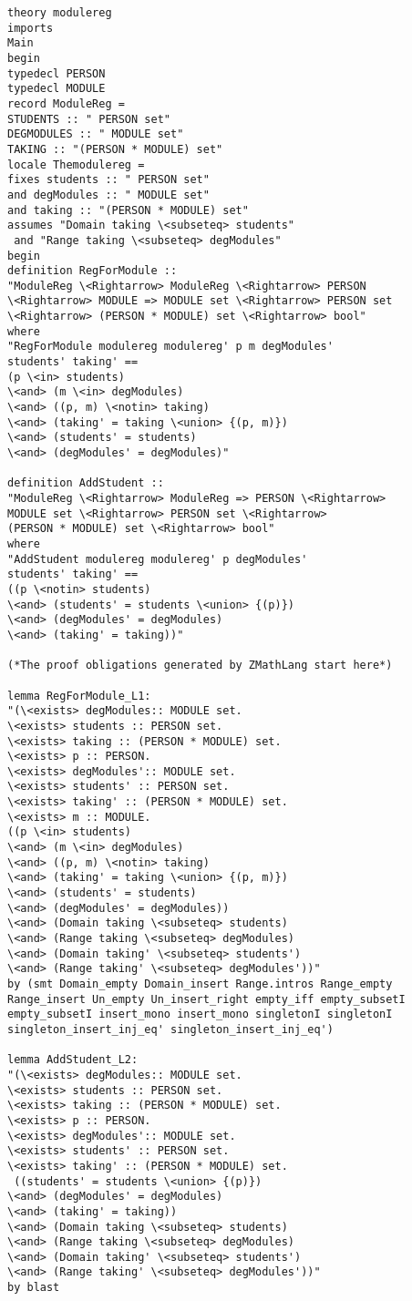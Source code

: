 \begin{scriptsize}
\begin{verbatim}
theory modulereg
imports 
Main 
begin 
typedecl PERSON 
typedecl MODULE
record ModuleReg = 
STUDENTS :: " PERSON set"
DEGMODULES :: " MODULE set"
TAKING :: "(PERSON * MODULE) set"
locale Themodulereg = 
fixes students :: " PERSON set"
and degModules :: " MODULE set"
and taking :: "(PERSON * MODULE) set"
assumes "Domain taking \<subseteq> students" 
 and "Range taking \<subseteq> degModules"
begin
definition RegForModule :: 
"ModuleReg \<Rightarrow> ModuleReg \<Rightarrow> PERSON
\<Rightarrow> MODULE => MODULE set \<Rightarrow> PERSON set
\<Rightarrow> (PERSON * MODULE) set \<Rightarrow> bool"
where 
"RegForModule modulereg modulereg' p m degModules'
students' taking' ==
(p \<in> students) 
\<and> (m \<in> degModules) 
\<and> ((p, m) \<notin> taking)
\<and> (taking' = taking \<union> {(p, m)}) 
\<and> (students' = students) 
\<and> (degModules' = degModules)"

definition AddStudent :: 
"ModuleReg \<Rightarrow> ModuleReg => PERSON \<Rightarrow>
MODULE set \<Rightarrow> PERSON set \<Rightarrow>
(PERSON * MODULE) set \<Rightarrow> bool"
where 
"AddStudent modulereg modulereg' p degModules'
students' taking' ==
((p \<notin> students)
\<and> (students' = students \<union> {(p)}) 
\<and> (degModules' = degModules) 
\<and> (taking' = taking))"

(*The proof obligations generated by ZMathLang start here*)

lemma RegForModule_L1:
"(\<exists> degModules:: MODULE set.
\<exists> students :: PERSON set.
\<exists> taking :: (PERSON * MODULE) set.
\<exists> p :: PERSON.
\<exists> degModules':: MODULE set.
\<exists> students' :: PERSON set.
\<exists> taking' :: (PERSON * MODULE) set.
\<exists> m :: MODULE.
((p \<in> students) 
\<and> (m \<in> degModules) 
\<and> ((p, m) \<notin> taking)
\<and> (taking' = taking \<union> {(p, m)}) 
\<and> (students' = students) 
\<and> (degModules' = degModules))
\<and> (Domain taking \<subseteq> students)
\<and> (Range taking \<subseteq> degModules)
\<and> (Domain taking' \<subseteq> students')
\<and> (Range taking' \<subseteq> degModules'))"
by (smt Domain_empty Domain_insert Range.intros Range_empty 
Range_insert Un_empty Un_insert_right empty_iff empty_subsetI 
empty_subsetI insert_mono insert_mono singletonI singletonI 
singleton_insert_inj_eq' singleton_insert_inj_eq')

lemma AddStudent_L2:
"(\<exists> degModules:: MODULE set.
\<exists> students :: PERSON set.
\<exists> taking :: (PERSON * MODULE) set.
\<exists> p :: PERSON.
\<exists> degModules':: MODULE set.
\<exists> students' :: PERSON set.
\<exists> taking' :: (PERSON * MODULE) set.
 ((students' = students \<union> {(p)}) 
\<and> (degModules' = degModules) 
\<and> (taking' = taking))
\<and> (Domain taking \<subseteq> students)
\<and> (Range taking \<subseteq> degModules)
\<and> (Domain taking' \<subseteq> students')
\<and> (Range taking' \<subseteq> degModules'))"
by blast


\end{verbatim}
\end{scriptsize}
